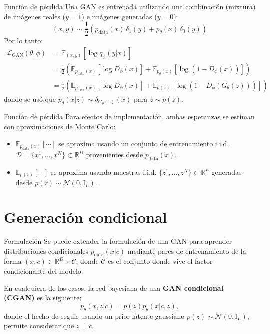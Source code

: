 \documentclass{beamer}
\newcommand{\R}{\mathbb{R}}
\begin{document}
\begin{frame}{Función de pérdida}
    Una GAN es entrenada utilizando una combinación (mixtura) de imágenes reales ($y=1$) e imágenes generadas ($y=0$):
    \begin{equation*}
        (x,y) \sim \frac{1}{2}\left(p_\text{data}(x)\,\delta_1(y)+p_\theta(x)\,\delta_0(y)\right)
    \end{equation*}
    Por lo tanto:
    \begin{align*}
        \mathcal{L}_\text{GAN}(\theta,\phi)
         & =\mathbb{E}_{(x,y)}\left[\log q_\phi(y|x)\right]                                                                                                       \\
         & =\frac{1}{2}\left(\mathbb{E}_{p_\text{data}(x)}\left[\log D_\phi(x)\right]
        + \mathbb{E}_{p_\theta(x)}\left[\log (1-D_\phi(x))\right]\right)                                                                                          \\
         & =\frac{1}{2}\left(\mathbb{E}_{p_\text{data}(x)}\left[\log D_\phi(x)\right]+\mathbb{E}_{p(z)}\left[\log\left(1-D_\phi(G_\theta(z))\right)\right]\right)
    \end{align*}
    donde se usó que $p_\theta(x|z)\sim\delta_{G_\theta(z)}(x)$ para $z\sim p(z)$.
\end{frame}

\begin{frame}{Función de pérdida}
    Para efectos de implementación, ambas esperanzas se estiman con aproximaciones de Monte Carlo:
    \begin{itemize}
        \item $\mathbb{E}_{p_\text{data}(x)}[\cdots]$ se aproxima usando un conjunto de entrenamiento i.i.d. $\mathcal{D}=\{x^1,\ldots,x^N\}\subset\R^D$ provenientes desde $p_\text{data}(x)$.
        \item $\mathbb{E}_{p(z)}[\cdots]$ se aproxima usando muestras i.i.d. $\{z^1,\ldots,z^N\}\subset\R^L$ generadas desde $p(z)\sim\mathcal{N}(0,\text{I}_L)$.
    \end{itemize}
\end{frame}

\section{Generación condicional}

\begin{frame}{Formulación}
    Se puede extender la formulación de una GAN para aprender distribuciones condicionales $p_\text{data}(x|c)$ mediante pares de entrenamiento de la forma $(x,c)\in\R^D\times\mathcal{C}$, donde $\mathcal{C}$ es el conjunto donde vive el factor condicionante del modelo.

    En cualquiera de los casos, la red bayesiana de una \textbf{GAN condicional (CGAN)} es la siguiente:
    \begin{equation*}
        p_\theta(x,z|c)=p(z)p_\theta(x|c,z),
    \end{equation*}
    donde el hecho de seguir usando un prior latente gaussiano $p(z)\sim\mathcal{N}(0,\text{I}_L)$, permite considerar que $z\perp c$.
\end{frame}
\end{document}
